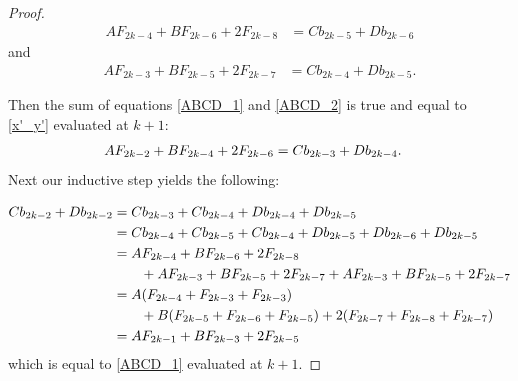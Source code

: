 \documentclass[10pt,a4paper]{amsart}
\begin{document}
\begin{proof}
\begin{align}
 AF_{2k-4}+BF_{2k-6}+2F_{2k-8}
   &=Cb_{2k-5}+Db_{2k-6} \label{ABCD_1}
   \end{align} and 
 \begin{align} 
    AF_{2k-3}+BF_{2k-5}+2F_{2k-7}&=Cb_{2k-4}+Db_{2k-5}.\label{ABCD_2}
\end{align} 

Then the sum of equations \eqref{ABCD_1}  and \eqref{ABCD_2}  is true and equal to  \eqref{x'_y'} evaluated at $k+1:$  
\begin{align}
 AF_{2k-2}+BF_{2k-4}+2F_{2k-6}
   &=Cb_{2k-3}+Db_{2k-4}.\notag
   \end{align}
Next our inductive step yields the following:

\begin{align}
 Cb_{2k-2}+Db_{2k-2}&=Cb_{2k-3}+Cb_{2k-4}+Db_{2k-4}+Db_{2k-5}\notag\\
 &=Cb_{2k-4}+Cb_{2k-5}+Cb_{2k-4}+Db_{2k-5}+Db_{2k-6}+Db_{2k-5}\notag\\
 &=AF_{2k-4}+BF_{2k-6}+2F_{2k-8}\notag\\
 & \qquad +AF_{2k-3}+BF_{2k-5}+2F_{2k-7}+AF_{2k-3}+BF_{2k-5}+2F_{2k-7}\notag\\
 &=A(F_{2k-4} + F_{2k-3}+F_{2k-3})\notag\\
 &\notag 
 \qquad +B(F_{2k-5}+ F_{2k-6} +F_{2k-5})+2(F_{2k-7}+F_{2k-8}+F_{2k-7})\\
 &=AF_{2k-1}+BF_{2k-3}+2F_{2k-5} \notag
   \end{align}
   which is equal to \eqref{ABCD_1} evaluated at $k+1$.
\end{proof}
\end{document}
